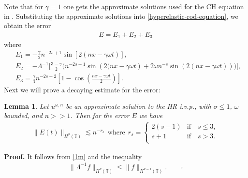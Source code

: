 \documentclass[12pt,reqno]{amsart}
\renewcommand{\qedsymbol}{\ensuremath{\square}}
\newcommand{\ci}{\mathbb{T}}
\theoremstyle{plain}  %
\newtheorem{lemma}{Lemma}
\theoremstyle{definition}
\begin{document}
%
%
%
%
Note that for $\gamma=1$ 
one gets the  approximate solutions
used for the CH equation in \cite{Himonas_2009_Non-uniform-dep-per}.
%
%
Substituting the approximate solutions into 
\eqref{hyperelastic-rod-equation}, we obtain the error
%
%
\begin{equation}
\begin{split}
E=
E_1 + E_2 + E_3 \label{57}
\end{split}
\end{equation}
%
%
where
\begin{align}
\label{90*}
& E_1 =
- \frac{\gamma}{2}n^{-2s+1}\sin\left[ 2\left( nx - \gamma \omega t \right)
\right],
\\
\label{90**}
& E_2 = - \Lambda^{-1} \bigg[ \frac{3-\gamma}{2} \bigg (
n^{-2s+1} \sin\left( 2(nx - \gamma \omega t \right) + 2\omega n^{-s} \sin( 
2(nx - \gamma \omega t))
\bigg )
\bigg ],
\\
& E_3 = \frac{\gamma}{4}
n^{-2s+2} \left [ 1- \cos \left (\frac{nx - \gamma \omega t}{2} \right) 
\right ].
\label{90}
\end{align}
%
%
%
Next we will prove a decaying estimate for the error:
%
%
%
%
%                      
%
%
%
%
\begin{lemma}
\label{lem:error_of_approx_solution}
Let $u^{\omega,n}$ be an approximate solution to the HR i.v.p., with 
$\sigma \le 1$,  $\omega$ bounded, and $n >> 1$.
Then for the error $E$ we have
%
%
\begin{equation}
\label{total-error-approx-solution}
\begin{split}
	\|E(t)\|_{H^\sigma(\ci)} \lesssim n^{-r_s} \ \ \text{where} \ \ r_s = 
\begin{cases}
2(s-1)   & \text{if} \quad s \le 3,\\  s+1  & \text{if} \quad s > 3. \\
\end{cases}
\end{split}
\end{equation}
%
%
%
%
\end{lemma}
%
%
%
%
%
%
%
{\bf Proof.} It follows from \eqref{1m} and the inequality
%
%
%
%
\begin{equation*}
\begin{split}
\|\Lambda^{-1}f \|_{H^{k}(\ci)} \le
\|f\|_{H^{k-1}(\ci)}. \qquad \qedsymbol
\label{operator norm of pseudo-diff operator we use}
\end{split}
\end{equation*}
\end{document}
